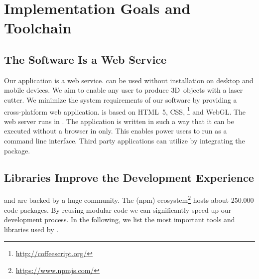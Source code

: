 \documentclass[../ClassicThesis.tex]{subfiles}
\begin{document}
\chapter{Implementation Goals and Toolchain}
\label{ch:toolchain}

\section{The Software Is a Web Service}

Our application {\platener} is a web service. {\platener}
can be used without installation on desktop and mobile
devices. We aim to enable any user to produce 3D~objects
with a laser cutter. We minimize the system requirements of
our software by providing a cross-platform web application.
{\platener} is based on HTML~5, CSS,
{\coffeescript}\footnote{\url{http://coffeescript.org/}} and
WebGL. The web server runs in {\nodejs}. The application is
written in such a way that it can be executed without a
browser in {\nodejs} only. This enables power users to run
{\platener} as a command line interface. Third party
applications can utilize {\platener} by integrating the
{\nodejs} package.

\section{Libraries Improve the Development Experience}

{\javascript} and {\nodejs} are backed by a huge community.
The  (npm)
ecosystem\footnote{\url{https://www.npmjs.com/}} hosts about
250.000 code packages. By reusing modular code we can
significantly speed up our development process. In the
following, we list the most important tools and libraries
used by {\platener}.
\end{document}
